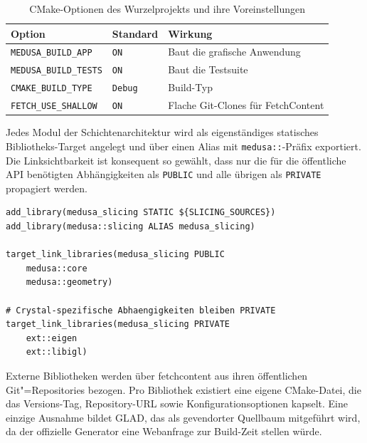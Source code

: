                 \begin{table}[ht]
                    \centering
                    \caption[CMake-Optionen des Wurzelprojekts]{CMake-Optionen des Wurzelprojekts und ihre Voreinstellungen}
                    \label{tab:impl-medusa-cmake-options}
                    \renewcommand{\arraystretch}{1.2}
                    \begin{tabular}{@{} l l p{6.0cm} @{}}
                        \toprule
                        \textbf{Option} & \textbf{Standard} & \textbf{Wirkung} \\
                        \midrule
                        \texttt{MEDUSA\_BUILD\_APP}   & \texttt{ON}    & Baut die grafische Anwendung \\
                        \texttt{MEDUSA\_BUILD\_TESTS} & \texttt{ON}    & Baut die Testsuite \\
                        \texttt{CMAKE\_BUILD\_TYPE}   & \texttt{Debug} & Build-Typ \\
                        \texttt{FETCH\_USE\_SHALLOW}  & \texttt{ON}    & Flache Git-Clones für FetchContent \\
                        \bottomrule
                    \end{tabular}
                \end{table}

                Jedes Modul der Schichtenarchitektur wird als eigenständiges statisches Bibliotheks-Target angelegt und über einen Alias mit \texttt{medusa::}-Präfix exportiert.
                Die Linksichtbarkeit ist konsequent so gewählt, dass nur die für die öffentliche API benötigten Abhängigkeiten als \texttt{PUBLIC} und alle übrigen als \texttt{PRIVATE} propagiert werden.

                \begin{lstlisting}[style=cmakeStyle, caption={Linkkonfiguration von \texttt{medusa::slicing} (Ausschnitt).}, label={lst:impl-medusa-slicing-cmake}]
add_library(medusa_slicing STATIC ${SLICING_SOURCES})
add_library(medusa::slicing ALIAS medusa_slicing)

target_link_libraries(medusa_slicing PUBLIC
    medusa::core
    medusa::geometry)

# Crystal-spezifische Abhaengigkeiten bleiben PRIVATE
target_link_libraries(medusa_slicing PRIVATE
    ext::eigen
    ext::libigl)
                \end{lstlisting}

                Externe Bibliotheken werden über \gls{fetchcontent} aus ihren öffentlichen Git"=Repositories bezogen.
                Pro Bibliothek existiert eine eigene CMake-Datei, die das Versions-Tag, Repository-\ac{URL} sowie Konfigurationsoptionen kapselt.
                Eine einzige Ausnahme bildet GLAD, das als gevendorter Quellbaum mitgeführt wird, da der offizielle Generator eine Webanfrage zur Build-Zeit stellen würde.

